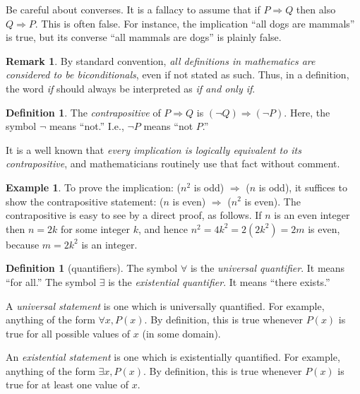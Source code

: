 \documentclass[11pt]{article}
\theoremstyle{definition}
\newtheorem{defn}[thm]{Definition}
\newtheorem{example}[thm]{Example}
\newtheorem{rmk}[thm]{Remark}
\renewcommand{\implies}{\Rightarrow}
\begin{document}
Be careful about converses. It is a fallacy to assume that if $P
\implies Q$ then also $Q \implies P$. This is often false. For
instance, the implication ``all dogs are mammals'' is true, but its
converse ``all mammals are dogs'' is plainly false.

\begin{rmk}\label{rmk:defs}
  By standard convention, {\em all definitions in mathematics are
    considered to be biconditionals}, even if not stated as
  such. Thus, in a definition, the word \emph{if} should always be
  interpreted as \emph{if and only if}.
\end{rmk}

\begin{defn}
  The {\em contrapositive} of $P \implies Q$ is
  $(\neg Q) \implies (\neg P)$. Here, the symbol $\neg$ means ``not.''
  I.e., $\neg P$ means ``not $P$.''
\end{defn}

It is a well known that {\em every implication is logically equivalent
  to its contrapositive}, and mathematicians routinely use that fact
without comment. 

\begin{example}
  To prove the implication: ($n^2$ is odd) $\implies$ ($n$ is odd), it
  suffices to show the contrapositive statement: ($n$ is even)
  $\implies$ ($n^2$ is even). The contrapositive is easy to see by a
  direct proof, as follows. If $n$ is an even integer then $n=2k$ for
  some integer $k$, and hence $n^2 = 4k^2 = 2(2k^2) = 2m$ is even,
  because $m = 2k^2$ is an integer.
\end{example}


\begin{defn}[quantifiers]
  The symbol $\forall$ is the \emph{universal
    quantifier}. It means ``for all.''  The symbol
  $\exists$ is the \emph{existential quantifier}. It means ``there
  exists.''
\end{defn}

A \emph{universal statement} is one which
is universally quantified. For example, anything of the form $\forall
x, P(x)$.  By definition, this is true whenever $P(x)$ is true for all
possible values of $x$ (in some domain).

An \emph{existential statement} is one
which is existentially quantified. For example, anything of the form
$\exists x, P(x)$. By definition, this is true whenever $P(x)$ is true
for at least one value of $x$.
\end{document}
